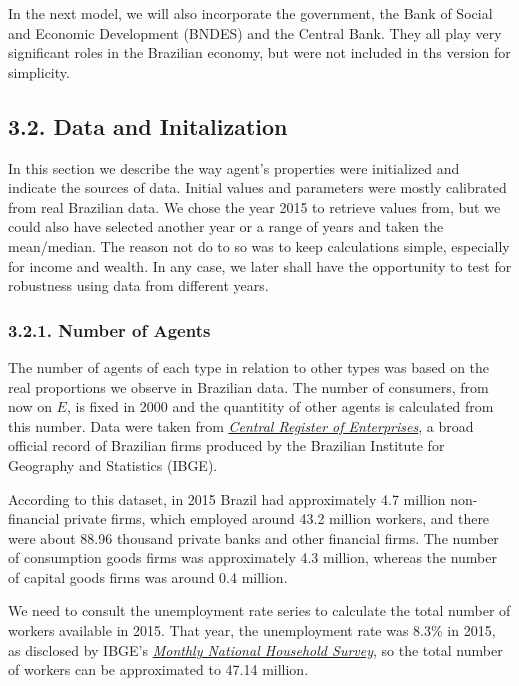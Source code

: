 \documentclass[11pt,]{article}
\begin{document}
In the next model, we will also incorporate the government, the Bank of
Social and Economic Development (BNDES) and the Central Bank. They all
play very significant roles in the Brazilian economy, but were not
included in ths version for simplicity.

\subsection{3.2. Data and Initalization}\label{data-and-initalization}

In this section we describe the way agent's properties were initialized
and indicate the sources of data. Initial values and parameters were
mostly calibrated from real Brazilian data. We chose the year 2015 to
retrieve values from, but we could also have selected another year or a
range of years and taken the mean/median. The reason not do to so was to
keep calculations simple, especially for income and wealth. In any case,
we later shall have the opportunity to test for robustness using data
from different years.

\subsubsection{3.2.1. Number of Agents}\label{number-of-agents}

The number of agents of each type in relation to other types was based
on the real proportions we observe in Brazilian data. The number of
consumers, from now on \(E\), is fixed in 2000 and the quantitity of
other agents is calculated from this number. Data were taken from
\href{https://sidra.ibge.gov.br/pesquisa/cempre/quadros/brasil/2015}{\emph{Central
Register of Enterprises}}, a broad official record of Brazilian firms
produced by the Brazilian Institute for Geography and Statistics (IBGE).

According to this dataset, in 2015 Brazil had approximately 4.7 million
non-financial private firms, which employed around 43.2 million workers,
and there were about 88.96 thousand private banks and other financial
firms. The number of consumption goods firms was approximately 4.3
million, whereas the number of capital goods firms was around 0.4
million.

We need to consult the unemployment rate series to calculate the total
number of workers available in 2015. That year, the unemployment rate
was 8.3\% in 2015, as disclosed by IBGE's
\href{https://sidra.ibge.gov.br/tabela/6381}{\emph{Monthly National
Household Survey}}, so the total number of workers can be approximated
to 47.14 million.
\end{document}
